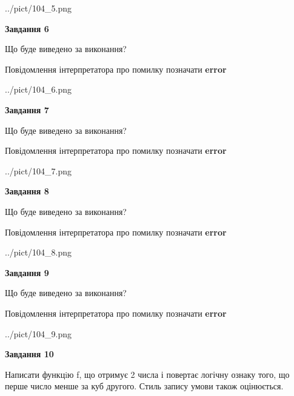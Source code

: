 \documentclass[12pt, ukrainian]{article}
\begin{document}
{\begin {large}
\begin{center}
	{../pict/104_5.png}
\end{center}
\newpage

{\begin {center}\textbf{Завдання 6}\end {center}}\par
Що буде виведено за виконання? \par
Повідомлення інтерпретатора про помилку позначати \textbf{error}

\begin{center}
	{../pict/104_6.png}
\end{center}
\newpage

{\begin {center}\textbf{Завдання 7}\end {center}}\par
Що буде виведено за виконання? \par
Повідомлення інтерпретатора про помилку позначати \textbf{error}

\begin{center}
	{../pict/104_7.png}
\end{center}
\newpage

{\begin {center}\textbf{Завдання 8}\end {center}}\par
Що буде виведено за виконання? \par
Повідомлення інтерпретатора про помилку позначати \textbf{error}

\begin{center}
	{../pict/104_8.png}
\end{center}
\newpage

{\begin {center}\textbf{Завдання 9}\end {center}}\par
Що буде виведено за виконання? \par
Повідомлення інтерпретатора про помилку позначати \textbf{error}

\begin{center}
	{../pict/104_9.png}
\end{center}
\newpage

{\begin {center}\textbf{Завдання 10}\end {center}}\par

Написати функцiю f, що отримує 2 числа і повертає логічну ознаку того, що перше число менше за куб другого. Стиль запису умови також оцінюється.\par
\newpage

\end {large}}
\end{document}
